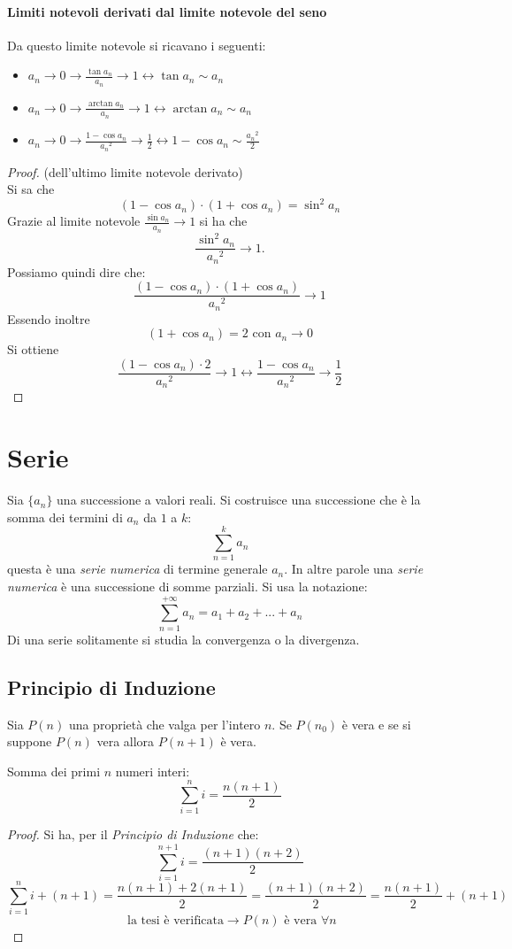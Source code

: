 \documentclass[a4paper,12pt, oneside]{book}
\begin{document}
\subsubsection{Limiti notevoli derivati dal limite notevole del seno}
Da questo limite notevole si ricavano i seguenti:
\begin{itemize}
	\item $a_n\rightarrow 0 \longrightarrow \frac{\tan{a_n}}{a_n}\rightarrow 1 \longleftrightarrow \tan{a_n}\sim a_n$
	\item $a_n\rightarrow 0 \longrightarrow \frac{\arctan{a_n}}{a_n}\rightarrow 1 \longleftrightarrow \arctan{a_n}\sim a_n$
	\item $a_n\rightarrow 0 \longrightarrow \frac{1-\cos{a_n}}{{a_n}^{2}}\rightarrow \frac{1}{2} \longleftrightarrow 1-\cos{a_n}\sim \frac{{a_n}^{2}}{2}$
\end{itemize}
\begin{proof}(dell'ultimo limite notevole derivato)\\
	Si sa che $$(1-\cos{a_n})\cdot(1+\cos{a_n})=\sin^2{a_n}$$
	Grazie al limite notevole $\frac{\sin{a_n}}{a_n} \rightarrow 1$ si ha che $$\frac{\sin^2{a_n}}{{a_n}^{2}} \rightarrow 1.$$
	Possiamo quindi dire che: $$\frac{(1-\cos{a_n})\cdot(1+\cos{a_n})}{{a_n}^{2}}\rightarrow 1$$
	Essendo inoltre $$(1+\cos{a_n})=2 \mbox{ con } a_n\rightarrow 0$$
	Si ottiene $$\frac{(1-\cos{a_n})\cdot 2}{{a_n}^{2}}\rightarrow 1 \longleftrightarrow \frac{1-\cos{a_n}}{{a_n}^{2}}\rightarrow \frac{1}{2} $$
\end{proof}

\chapter{Serie}
Sia $\{a_n\}$ una successione a valori reali. Si costruisce una successione che è la somma dei termini di $a_n$ da $1$ a $k$:
$$\sum_{n=1}^{k}a_n$$
questa è una \textit{serie numerica} di termine generale $a_n$.
In altre parole una \textit{serie numerica} è una successione di somme parziali. Si usa la notazione:$$\sum_{n=1}^{+\infty} a_n = a_1+a_2+...+a_n$$
Di una serie solitamente si studia la convergenza o la divergenza.
\begin{shaded}
	\section{Principio di Induzione}
	Sia $P(n)$ una proprietà che valga per l'intero $n$. Se $P(n_0)$ è vera e se si suppone $P(n)$ vera allora $P(n+1)$ è vera.\\
	\begin{esempio}
		Somma dei primi $n$ numeri interi:
		\begin{equation}
			\sum_{i=1}^{n} i=\frac{n(n+1)}{2}
		\end{equation}
		\begin{proof}
			Si ha, per il \textit{Principio di Induzione} che: $$ \sum_{i=1}^{n+1} i= \frac{(n+1)(n+2)}{2}$$ $$ \sum_{i=1}^{n} i+(n+1) = \frac{n(n+1)+2(n+1)}{2}=\frac{(n+1)(n+2)}{2}= \frac{n(n+1)}{2}+(n+1)$$ $$\mbox{ la tesi è verificata} \rightarrow P(n) \mbox{ è vera } \forall n$$
		\end{proof}
	\end{esempio}
\end{shaded}
\end{document}
